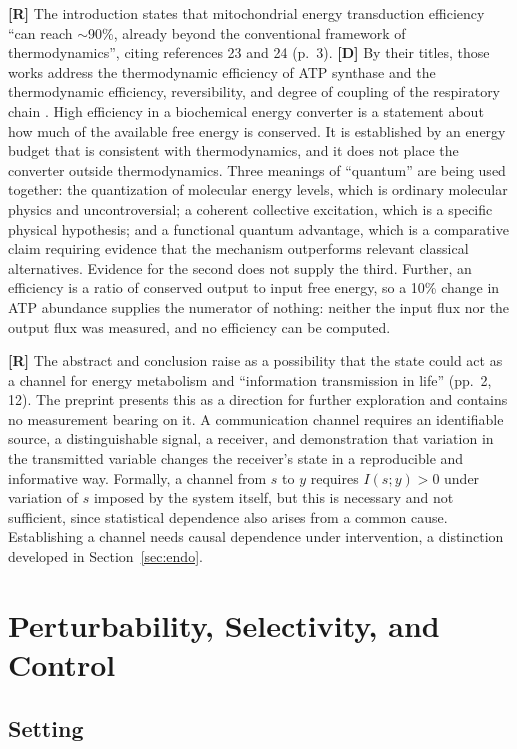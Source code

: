 \documentclass[11pt]{article}
\newcommand{\stR}{\textbf{\textcolor{blue!55!black}{[R]}}}
\newcommand{\stD}{\textbf{\textcolor{green!40!black}{[D]}}}
\theoremstyle{plain}
\theoremstyle{definition}
\theoremstyle{remark}
\begin{document}
\stR{} The introduction states that mitochondrial energy transduction efficiency ``can reach $\sim$90\%, already beyond the conventional framework of thermodynamics'', citing references 23 and 24 (p.~3). \stD{} By their titles, those works address the thermodynamic efficiency of ATP synthase and the thermodynamic efficiency, reversibility, and degree of coupling of the respiratory chain \cite{matta2015,wikstrom2020}. High efficiency in a biochemical energy converter is a statement about how much of the available free energy is conserved. It is established by an energy budget that is consistent with thermodynamics, and it does not place the converter outside thermodynamics. Three meanings of ``quantum'' are being used together: the quantization of molecular energy levels, which is ordinary molecular physics and uncontroversial; a coherent collective excitation, which is a specific physical hypothesis; and a functional quantum advantage, which is a comparative claim requiring evidence that the mechanism outperforms relevant classical alternatives. Evidence for the second does not supply the third. Further, an efficiency is a ratio of conserved output to input free energy, so a 10\% change in ATP abundance supplies the numerator of nothing: neither the input flux nor the output flux was measured, and no efficiency can be computed.

\stR{} The abstract and conclusion raise as a possibility that the state could act as a channel for energy metabolism and ``information transmission in life'' (pp.~2, 12). The preprint presents this as a direction for further exploration and contains no measurement bearing on it. A communication channel requires an identifiable source, a distinguishable signal, a receiver, and demonstration that variation in the transmitted variable changes the receiver's state in a reproducible and informative way. Formally, a channel from $s$ to $y$ requires $I(s;y)>0$ under variation of $s$ imposed by the system itself, but this is necessary and not sufficient, since statistical dependence also arises from a common cause. Establishing a channel needs causal dependence under intervention, a distinction developed in Section~\ref{sec:endo}.

\section{Perturbability, Selectivity, and Control}
\label{sec:control}

\subsection{Setting}
\end{document}
